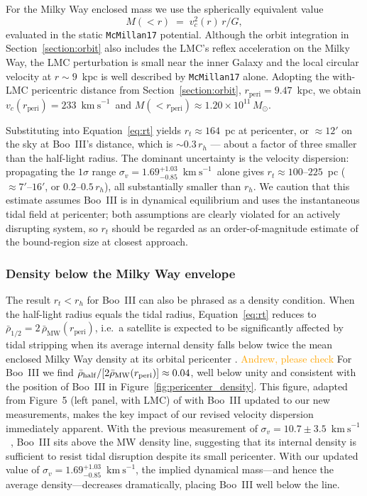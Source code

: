 \documentclass[twocolumn]{aastex631}
\newcommand{\vlosUnits}{$\mathrm{km~s}^{-1}$\xspace}
\newcommand{\fixme}{\textcolor{orange}}
\begin{document}
For the Milky Way enclosed mass we use the spherically equivalent value
\begin{equation}
    M(<r) \;=\; v_c^2(r)\,r/G,
\end{equation}
evaluated in the static \texttt{McMillan17} potential. Although the orbit integration in Section~\ref{section:orbit} also includes the LMC's reflex acceleration on the Milky Way, the LMC perturbation is small near the inner Galaxy and the local circular velocity at $r \sim 9$~kpc is well described by \texttt{McMillan17} alone. Adopting the with-LMC pericentric distance from Section~\ref{section:orbit}, $r_{\mathrm{peri}} = 9.47$~kpc, we obtain $v_c(r_{\mathrm{peri}}) = 233$~\vlosUnits\ and $M(<r_{\mathrm{peri}}) \approx 1.20 \times 10^{11}\,M_\odot$.

Substituting into Equation~\ref{eq:rt} yields $r_t \approx 164$~pc at pericenter, or $\approx 12'$ on the sky at Boo~III's distance, which is $\sim 0.3\,r_h$ --- about a factor of three smaller than the half-light radius. The dominant uncertainty is the velocity dispersion: propagating the $1\sigma$ range $\sigma_v = 1.69^{+1.03}_{-0.85}$~\vlosUnits\ alone gives $r_t \approx 100$--$225$~pc ($\approx 7'$--$16'$, or $0.2$--$0.5\,r_h$), all substantially smaller than $r_h$. We caution that this estimate assumes Boo~III is in dynamical equilibrium and uses the instantaneous tidal field at pericenter; both assumptions are clearly violated for an actively disrupting system, so $r_t$ should be regarded as an order-of-magnitude estimate of the bound-region size at closest approach.

\subsubsection{Density below the Milky Way envelope}
The result $r_t < r_h$ for Boo~III can also be phrased as a density condition.  When the half-light radius equals the tidal radius, Equation~\ref{eq:rt} reduces to $\bar\rho_{1/2} = 2\,\bar\rho_{\mathrm{MW}}(r_{\mathrm{peri}})$, i.e.\ a satellite is expected to be significantly affected by tidal stripping when its average internal density falls below twice the mean enclosed Milky Way density at its orbital pericenter \citep{Pace2022}. \fixme{Andrew, please check}  For Boo~III we find $\bar\rho_{\rm half}/[2\bar\rho_{\mathrm{MW}}(r_{\mathrm{peri}})] \approx 0.04$, well below unity and consistent with the position of Boo~III in Figure~\ref{fig:pericenter_density}.  This figure, adapted from Figure~5 (left panel, with LMC) of \citet{Pace2022} with Boo~III updated to our new measurements, makes the key impact of our revised velocity dispersion immediately apparent.  With the previous measurement of $\sigma_v = 10.7 \pm 3.5$~\vlosUnits\ \citep{Carlin2018}, Boo~III sits above the MW density line, suggesting that its internal density is sufficient to resist tidal disruption despite its small pericenter.  With our updated value of $\sigma_v = 1.69^{+1.03}_{-0.85}$~\vlosUnits, the implied dynamical mass---and hence the average density---decreases dramatically, placing Boo~III well below the line.
\end{document}

